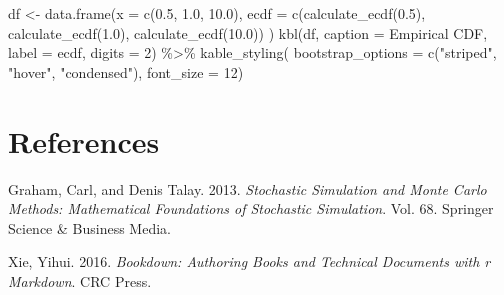 \documentclass[
  letterpaper,
  DIV=11,
  numbers=noendperiod]{scrartcl}
\newenvironment{Shaded}{\begin{snugshade}}{\end{snugshade}}
\newcommand{\AttributeTok}[1]{\textcolor[rgb]{0.40,0.45,0.13}{#1}}
\newcommand{\DecValTok}[1]{\textcolor[rgb]{0.68,0.00,0.00}{#1}}
\newcommand{\FloatTok}[1]{\textcolor[rgb]{0.68,0.00,0.00}{#1}}
\newcommand{\FunctionTok}[1]{\textcolor[rgb]{0.28,0.35,0.67}{#1}}
\newcommand{\NormalTok}[1]{\textcolor[rgb]{0.00,0.23,0.31}{#1}}
\newcommand{\OtherTok}[1]{\textcolor[rgb]{0.00,0.23,0.31}{#1}}
\newcommand{\SpecialCharTok}[1]{\textcolor[rgb]{0.37,0.37,0.37}{#1}}
\newcommand{\StringTok}[1]{\textcolor[rgb]{0.13,0.47,0.30}{#1}}
\newlength{\cslhangindent}
\newenvironment{CSLReferences}[2] %
 {\begin{list}{}{%
  \setlength{\itemindent}{0pt}
  \setlength{\leftmargin}{0pt}
  \setlength{\parsep}{0pt}
  \ifodd #1
   \setlength{\leftmargin}{\cslhangindent}
   \setlength{\itemindent}{-1\cslhangindent}
  \fi
  \setlength{\itemsep}{#2\baselineskip}}}
 {\end{list}}
\begin{document}
\begin{Shaded}
\begin{Highlighting}[]
\NormalTok{df }\OtherTok{\textless{}{-}} \FunctionTok{data.frame}\NormalTok{(}\AttributeTok{x =} \FunctionTok{c}\NormalTok{(}\FloatTok{0.5}\NormalTok{, }\FloatTok{1.0}\NormalTok{, }\FloatTok{10.0}\NormalTok{), }
                \AttributeTok{ecdf =} \FunctionTok{c}\NormalTok{(}\FunctionTok{calculate\_ecdf}\NormalTok{(}\FloatTok{0.5}\NormalTok{), }
                         \FunctionTok{calculate\_ecdf}\NormalTok{(}\FloatTok{1.0}\NormalTok{), }
                         \FunctionTok{calculate\_ecdf}\NormalTok{(}\FloatTok{10.0}\NormalTok{))}
\NormalTok{                )}
\FunctionTok{kbl}\NormalTok{(df,}
    \AttributeTok{caption =} \StringTok{\textquotesingle{}Empirical CDF\textquotesingle{}}\NormalTok{, }
    \AttributeTok{label =} \StringTok{\textquotesingle{}ecdf\textquotesingle{}}\NormalTok{,}
    \AttributeTok{digits =} \DecValTok{2}\NormalTok{) }\SpecialCharTok{\%\textgreater{}\%}
  \FunctionTok{kable\_styling}\NormalTok{(}
    \AttributeTok{bootstrap\_options =} \FunctionTok{c}\NormalTok{(}\StringTok{"striped"}\NormalTok{, }\StringTok{"hover"}\NormalTok{, }\StringTok{"condensed"}\NormalTok{),}
    \AttributeTok{font\_size =} \DecValTok{12}\NormalTok{)}
\end{Highlighting}
\end{Shaded}

\section*{References}\label{references}

\label{refs}
\begin{CSLReferences}{1}{0}
Graham, Carl, and Denis Talay. 2013. \emph{Stochastic Simulation and
Monte Carlo Methods: Mathematical Foundations of Stochastic Simulation}.
Vol. 68. Springer Science \& Business Media.

Xie, Yihui. 2016. \emph{Bookdown: Authoring Books and Technical
Documents with r Markdown}. CRC Press.

\end{CSLReferences}
\end{document}
